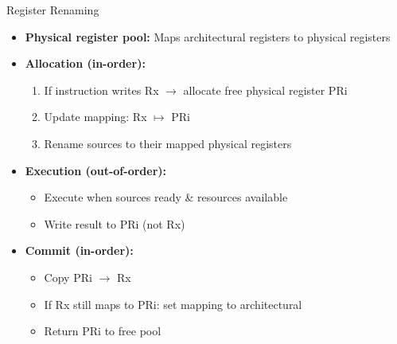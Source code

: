 \documentclass[aspectratio=169,12pt]{beamer}
\begin{document}
\begin{frame}{Register Renaming}
  \begin{itemize}
    \item \textbf{Physical register pool:} Maps architectural registers to physical registers
    
    \item \textbf{Allocation (in-order):}
    \begin{enumerate}
      \item If instruction writes Rx $\rightarrow$ allocate free physical register PRi
      \item Update mapping: Rx $\mapsto$ PRi
      \item Rename sources to their mapped physical registers
    \end{enumerate}
    
    \item \textbf{Execution (out-of-order):}
    \begin{itemize}
      \item Execute when sources ready \& resources available
      \item Write result to PRi (not Rx)
    \end{itemize}
    
    \item \textbf{Commit (in-order):}
    \begin{itemize}
      \item Copy PRi $\rightarrow$ Rx
      \item If Rx still maps to PRi: set mapping to architectural
      \item Return PRi to free pool
    \end{itemize}
  \end{itemize}
\end{frame}
\end{document}
